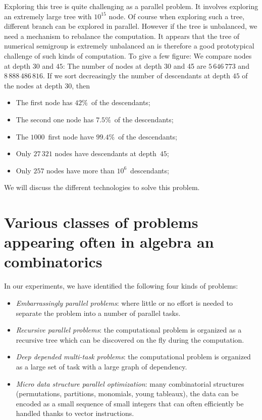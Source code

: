 \documentclass{deliverablereport}
\begin{document}
Exploring this tree is quite challenging as a parallel problem. It involves
exploring an extremely large tree with $10^{15}$ node. Of course when exploring
such a tree, different branch can be explored in parallel. However if the tree
is unbalanced, we need a mechanism to rebalance the computation. It appears
that the tree of numerical semigroup is extremely unbalanced an is therefore a
good prototypical challenge of such kinds of computation. To give a few
figure: We compare nodes at depth $30$ and $45$: The number of nodes at depth
30 and 45 are $5\,646\,773$ and $8\,888\,486\,816$. If we sort decreasingly
the number of descendants at depth $45$ of the nodes at depth $30$, then
\begin{itemize}
\item The first node has $42\%$~of the descendants;
\item The second one node has $7.5\%$~of the descendants;
\item The $1000$~first node have $99.4\%$~of the descendants;
\item Only $27\,321$ nodes have descendants at depth~$45$;
\item Only $257$ nodes have more than $10^6$~descendants;
\end{itemize}
We will discuss the different technologies to solve this problem.
\medskip


\section{Various classes of problems appearing often in algebra an combinatorics}

In our experiments, we have identified the following four kinds of problems:
\begin{itemize}
\item \emph{Embarrassingly parallel problems}: where little or no effort is
  needed to separate the problem into a number of parallel tasks.
\item \emph{Recursive parallel problems}: the computational problem is
  organized as a recursive tree which can be discovered on the fly during the
  computation.
\item \emph{Deep depended multi-task problems}: the computational problem is
  organized as a large set of task with a large graph of dependency.
\item \emph{Micro data structure parallel optimization}: many combinatorial
  structures (permutations, partitions, monomials, young tableaux), the data
  can be encoded as a small sequence of small integers that can often
  efficiently be handled thanks to vector instructions.
\end{itemize}
\end{document}
